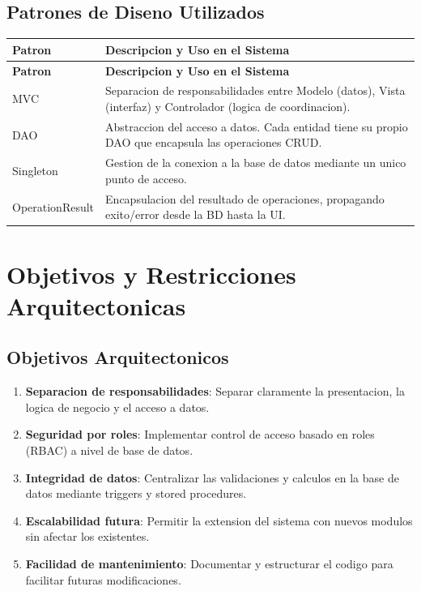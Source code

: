 \documentclass[12pt,a4paper]{article}
\begin{document}
\subsection{Patrones de Diseno Utilizados}

\begin{longtable}{|p{4cm}|p{10cm}|}
\hline
\rowcolor{udgreen!20}
\textbf{Patron} & \textbf{Descripcion y Uso en el Sistema} \\
\hline
\endfirsthead
\hline
\rowcolor{udgreen!20}
\textbf{Patron} & \textbf{Descripcion y Uso en el Sistema} \\
\hline
\endhead
MVC & Separacion de responsabilidades entre Modelo (datos), Vista (interfaz) y Controlador (logica de coordinacion). \\
\hline
DAO & Abstraccion del acceso a datos. Cada entidad tiene su propio DAO que encapsula las operaciones CRUD. \\
\hline
Singleton & Gestion de la conexion a la base de datos mediante un unico punto de acceso. \\
\hline
OperationResult & Encapsulacion del resultado de operaciones, propagando exito/error desde la BD hasta la UI. \\
\hline
\end{longtable}

\newpage
\section{Objetivos y Restricciones Arquitectonicas}

\subsection{Objetivos Arquitectonicos}

\begin{enumerate}
    \item \textbf{Separacion de responsabilidades}: Separar claramente la presentacion, la logica de negocio y el acceso a datos.
    \item \textbf{Seguridad por roles}: Implementar control de acceso basado en roles (RBAC) a nivel de base de datos.
    \item \textbf{Integridad de datos}: Centralizar las validaciones y calculos en la base de datos mediante triggers y stored procedures.
    \item \textbf{Escalabilidad futura}: Permitir la extension del sistema con nuevos modulos sin afectar los existentes.
    \item \textbf{Facilidad de mantenimiento}: Documentar y estructurar el codigo para facilitar futuras modificaciones.
\end{enumerate}
\end{document}
